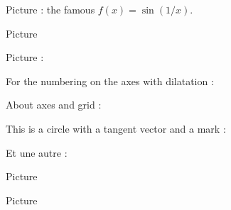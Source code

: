 
Picture  : the famous \( f(x)=\sin(1/x)\).
\begin{center}
   
\end{center}
   



Picture 
\begin{center}
   
\end{center}
   

Picture : 
\begin{center}
   
\end{center}
   

For the numbering on the axes with dilatation : 
\begin{center}
   
\end{center}




About axes and grid : 
\begin{center}
   
\end{center}
   


This is a circle with a tangent vector and a mark :

\begin{center}
    
\end{center}


Et une autre : 

\begin{center}
   
\end{center}


Picture 
\begin{center}
   
\end{center}
   

Picture 
\begin{center}
   
\end{center}


\clearpage

